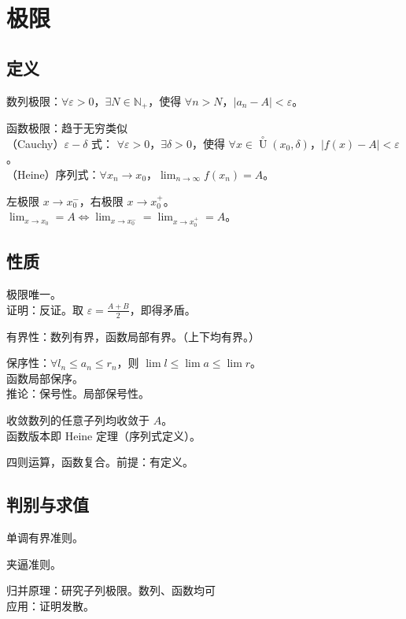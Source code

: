 \documentclass[12pt, a4paper, UTF8, openany]{ctexbook}
\newcommand{\field}[1]{\mathbb{#1}}%
\newcommand{\uzero}{\mathop{U}\limits^{\circ}}%
\newcommand{\eps}{\varepsilon}
\begin{document}
    \section{极限}
        \subsection{定义}
        数列极限：$\forall \eps > 0$，$\exists N \in \field{N}_+$，使得 $\forall n > N$，$|a_n - A| < \eps$。

        函数极限：趋于无穷类似\\
        （Cauchy）$\eps-\delta$ 式：
        $\forall \eps > 0$，$\exists \delta > 0$，使得 $\forall x \in \uzero(x_0, \delta)$，$|f(x) - A| < \eps$。\\
        （Heine）序列式：$\forall x_n \to x_0$，$\lim_{n \to \infty} f(x_n) = A$。

        左极限 $x \to x_0^-$，右极限 $x \to x_0^+$。\\
        $\lim_{x \to x_0} = A \iff \lim_{x \to x_0^{-}} = \lim_{x \to x_0^{+}} = A$。

        \subsection{性质}
        极限唯一。\\
        证明：反证。取 $\eps = \frac{A + B}{2}$，即得矛盾。

        有界性：数列有界，函数局部有界。（上下均有界。）

        保序性：$\forall l_n \leqslant a_n \leqslant r_n$，则 $\lim l \leqslant \lim a \leqslant \lim r$。\\
        函数局部保序。\\
        推论：保号性。局部保号性。

        收敛数列的任意子列均收敛于 $A$。\\
        函数版本即 Heine 定理（序列式定义）。

        四则运算，函数复合。{\heiti 前提}：有定义。

        \subsection{判别与求值}
        单调有界准则。

        夹逼准则。

        归并原理：研究子列极限。数列、函数均可\\
        {\heiti 应用}：证明发散。
\end{document}
